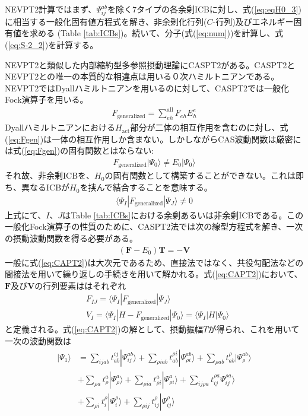 \documentclass[11pt,pra,aps]{revtex4}
\begin{document}
NEVPT2計算ではまず、$\Psi_{ij}^{ab}$を除く7タイプの各余剰ICBに対し、式(\ref{eq:eqH0_3})に相当する一般化固有値方程式を解き、非余剰化行列($C$-行列)及びエネルギー固有値を求める (Table \ref{tab:ICBs})。続いて、分子(式(\ref{eq:num}))を計算し、式(\ref{eq:S-2_2})を計算する。

NEVPT2と類似した内部縮約型多参照摂動理論にCASPT2がある。CASPT2とNEVPT2との唯一の本質的な相違点は用いる０次ハミルトニアンである。NEVPT2ではDyallハミルトニアンを用いるのに対して、CASPT2では一般化Fock演算子を用いる。
\begin{align}
  F_\text{generalized}=\sum_{eh}^\text{all} F_{eh} E^e_h \label{eq:Fgen}
\end{align}
Dyallハミルトニアンにおける$H_\text{act}$部分が二体の相互作用を含むのに対し、式(\ref{eq:Fgen})は一体の相互作用しか含まない。しかしながらCAS波動関数は厳密には式(\ref{eq:Fgen})の固有関数とはならない:
\begin{align}
  F_\text{generalized}|\Psi_0\rangle \neq E_0|\Psi_0\rangle \label{eq:Fgen}
\end{align}
それ故、非余剰ICBを、$H_0$の固有関数として構築することができない。これは即ち、異なるICBが$H_0$を挟んで結合することを意味する。
\begin{align}
  \langle \Psi_I|F_\text{generalized}|\Psi_J\rangle\neq0 \label{eq:coupling}
\end{align}
上式にて、$I$、$J$はTable \ref{tab:ICBs}における余剰あるいは非余剰ICBである。この一般化Fock演算子の性質のために、CASPT2法では次の線型方程式を解き、一次の摂動波動関数を得る必要がある。
\begin{align}
  \left(\mathbf{F}-E_0\right)\mathbf{T}=-\mathbf{V} \label{eq:CAPT2}
\end{align}
一般に式(\ref{eq:CAPT2})は大次元であるため、直接法ではなく、共役勾配法などの間接法を用いて繰り返しの手続きを用いて解かれる。式(\ref{eq:CAPT2})において、$\mathbf{F}$及び$\mathbf{V}$の行列要素ははそれぞれ
\begin{align}
  &F_{IJ}=\langle\Psi_I|F_\text{generalized}|\Psi_J\rangle \label{eq:fij} \\
  &V_{I} =\langle\Psi_I|H-F_\text{generalized}|\Psi_0\rangle = \langle\Psi_I|H|\Psi_0\rangle
\end{align}
と定義される。式(\ref{eq:CAPT2})の解として、摂動振幅$T$が得られ、これを用いて一次の波動関数は
\begin{align}
  |\Psi_1\rangle&=\sum_{ijab} t_{ab}^{ij} |\Psi_{ij}^{ab}\rangle+\sum_{\rho iab} t_{ab}^{\rho i} |\Psi_{\rho i}^{ab}\rangle+\sum_{\rho ab} t_{ab}^{\rho} |\Psi_{\rho}^{ab}\rangle \nonumber \\
  &+\sum_{\rho a} t_{\rho}^a |\Psi_{\rho}^{a}\rangle +\sum_{\rho ia} t_{\rho i}^a |\Psi_{\rho i}^{a}\rangle + \sum_{ij\rho a} t_{ij}^{\rho a} \Psi_{ij}^{\rho a}\rangle \nonumber \\
  &+\sum_{\rho i} t_i^{\rho} |\Psi_i^{\rho}\rangle+\sum_{\rho ij} t_{ij}^{\rho} |\Psi_{ij}^{\rho}\rangle
\end{align}
\end{document}
